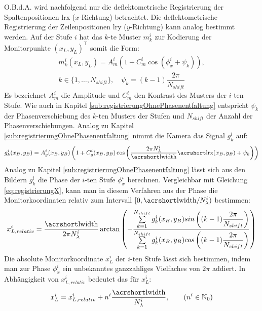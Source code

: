 \p
O.B.d.A. wird nachfolgend nur die deflektometrische Registrierung der Spaltenpositionen \acrshort{lrx} ($x$-Richtung) betrachtet.
Die deflektometrische Registrierung der Zeilenpositionen \acrshort{lry} ($y$-Richtung) kann analog bestimmt werden.
Auf der Stufe $i$ hat das $k$-te Muster $m_k^i$ zur Kodierung der Monitorpunkte $(x_L, y_L)^\top$ somit die Form:
%
\begin{equation}\label{eq:monitormuster_mehrstufig}
	\begin{gathered}	
		m_k^i(x_L,y_L) = A_m^i \left(1 + C_m^i \cos \left(\phi_x^i + \psi_k\right)\right),\\
		k \in \lbrace 1,\ldots,N_{shift}\rbrace,
		\quad
		\psi_k = (k - 1)\dfrac{2\pi}{N_{shift}}
	\end{gathered}
\end{equation}
%
Es bezeichnet $A_m^i$ die Amplitude und $C_m^i$ den Kontrast des Musters der $i$-ten Stufe.
Wie auch in Kapitel \ref{sub:registrierungOhnePhasenentfaltung} entspricht $\psi_k$ der Phasenverschiebung des $k$-ten Musters der Stufen und $N_{shift}$ der Anzahl der Phasenverschiebungen.
Analog zu Kapitel \ref{sub:registrierungOhnePhasenentfaltung} nimmt die Kamera das Signal $g_k^i$ auf:
%
\begin{equation}\label{eq:kamerabild_mehrstufig}
	g_k^i(x_B, y_B) = A_g^i(x_B, y_B) \left(1 + C_g^i(x_B, y_B) \cos \left(\dfrac{2\pi N_\lambda^i}{\acrshortmath{lwidth}}\acrshortmath{lrx}(x_B, y_B) + \psi_k\right)\right)
\end{equation}
%
Analog zu Kapitel \ref{sub:registrierungOhnePhasenentfaltung} lässt sich aus den Bildern $g_k^i$ die Phase der $i$-ten Stufe $\phi_x^i$ berechnen.
Vergleichbar mit Gleichung \ref{eq:registrierungX}, kann man in diesem Verfahren aus der Phase die Monitorkoordinaten relativ zum Intervall $[0,\acrshortmath{lwidth}/N_\lambda^i)$ bestimmen:
%
\begin{equation}\label{eq:registrierungX_relativ}
	x_{L,relativ}^i =
	\dfrac{\acrshortmath{lwidth}}{2\pi N_\lambda^i}
	\arctan 
	\left( 
		-\dfrac
		{\sum\limits_{k=1}^{N_{shift}} g_k^i(x_B, y_B) sin\left((k - 1)\dfrac{2\pi}{N_{shift}}\right)}
		{\sum\limits_{k=1}^{N_{shift}} g_k^i(x_B, y_B) cos\left((k - 1)\dfrac{2\pi}{N_{shift}}\right)}
	\right)
\end{equation}
%
Die absolute Monitorkoordinate $x_L^i$ der $i$-ten Stufe lässt sich bestimmen, indem man zur Phase $\phi_x^i$ ein unbekanntes ganzzahliges Vielfaches von $2\pi$ addiert.
In Abhängigkeit von $x_{L,relativ}^i$ bedeutet das für $x_L^i$:
%
\begin{equation}\label{eq:registrierungX_absolut}
	x_L^i = x_{L,relativ}^i + n^i \dfrac{\acrshortmath{lwidth}}{N_\lambda^i},
	\qquad
	(n^i \in \mathbb{N}_0)
\end{equation}
